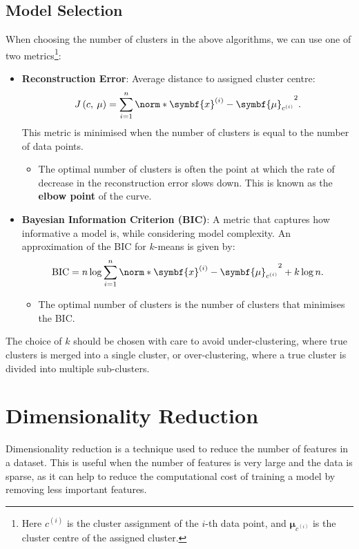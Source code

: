 \documentclass{article}
\begin{document}
\subsection{Model Selection}
When choosing the number of clusters in the above algorithms, we can
use one of two metrics\footnote{Here \(c^{\left( i \right)}\) is the
cluster assignment of the \(i\)-th data point, and
\(\symbf{\mu}_{c^{\left( i \right)}}\) is the cluster centre of the
assigned cluster.}:
\begin{itemize}
    \item \textbf{Reconstruction Error}: Average distance to assigned
          cluster centre:
          \begin{equation*}
              J\left( c,\: \mu \right) = \sum_{i = 1}^n \norm*{\symbf{x}^{\left( i \right)} - \symbf{\mu}_{c^{\left( i \right)}}}^2.
          \end{equation*}
          This metric is minimised when the number of clusters is equal to the number of data points.
          \begin{itemize}
              \item The optimal number of clusters is often the point
                    at which the rate of decrease in the reconstruction
                    error slows down. This is known as the
                    \textbf{elbow point} of the curve.
          \end{itemize}
    \item \textbf{Bayesian Information Criterion (BIC)}: A metric that
          captures how informative a model is, while considering model
          complexity. An approximation of the BIC for \(k\)-means is given by:
          \begin{equation*}
              \text{BIC} = n \log{\sum_{i = 1}^n \norm*{\symbf{x}^{\left( i \right)} - \symbf{\mu}_{c^{\left( i \right)}}}^2} + k \log{n}.
          \end{equation*}
          \begin{itemize}
              \item The optimal number of clusters is the number of
                    clusters that minimises the BIC.
          \end{itemize}
\end{itemize}
The choice of \(k\) should be chosen with care to avoid under-clustering,
where true clusters is merged into a single cluster, or over-clustering,
where a true cluster is divided into multiple sub-clusters.
\section{Dimensionality Reduction}
Dimensionality reduction is a technique used to reduce the number of
features in a dataset. This is useful when the number of features is
very large and the data is sparse, as it can help to reduce the
computational cost of training a model by removing less important
features.
\end{document}
